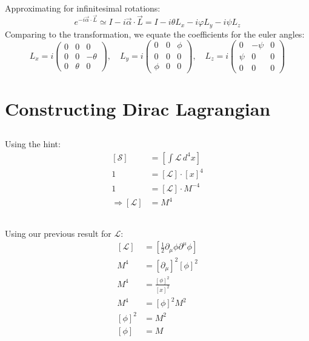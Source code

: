 \documentclass[11pt]{article}
\newcommand{\half}{\frac{1}{2}}
\begin{document}
Approximating for infinitesimal rotations:
\begin{equation}
    e^{-i\vec \alpha\cdot \vec L} \simeq 
    I - i\vec \alpha\cdot\vec L =
    I-i\theta L_x -i\varphi L_y - i\psi L_z
\end{equation}
Comparing to the transformation, we equate the coefficients for the euler angles:
\begin{equation}
    L_x = i
    \begin{pmatrix}
        0&0&0\\
        0&0&-\theta\\
        0&\theta&0
    \end{pmatrix}
    ,\quad
    L_y = i
    \begin{pmatrix}
        0&0&\phi\\
        0&0&0\\
        \phi&0&0
    \end{pmatrix}
    ,\quad
    L_z = i
    \begin{pmatrix}
        0&-\psi&0\\
        \psi&0&0\\
        0&0&0
    \end{pmatrix}
\end{equation}


\section{Constructing Dirac Lagrangian}
\subsection{}
Using the hint:
\begin{equation}
\begin{split}
    [\mathcal S] &= \left[\int\mathcal L\,d^4x \right]\\
    1 &= [\mathcal L]\cdot [x]^4\\
    1 &= [\mathcal L]\cdot M^{-4}\\
    \Rightarrow [\mathcal L] &= M^4
\end{split}
\end{equation}

\subsection{}
Using our previous result for $\mathcal L$:
\begin{equation}
\begin{split}
    [\mathcal L] &= \left[\half \partial_\mu\phi\partial^\mu\phi \right]\\
    M^4 &= [\partial_\mu]^2[\phi]^2\\
    M^4 &= \frac{[\phi]^2}{[x]^2}\\
    M^4 &= [\phi]^2 M^2\\
    [\phi]^2 &= M^2\\
    [\phi] &= M
\end{split}
\end{equation}
\end{document}
